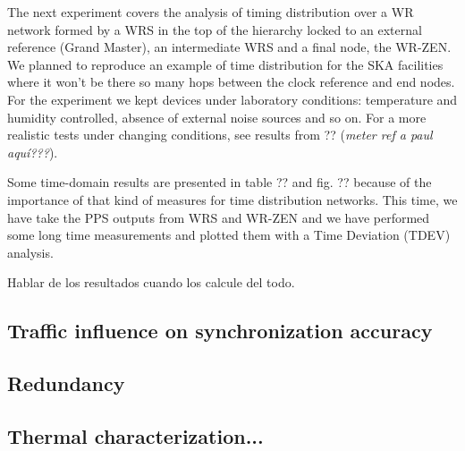 The next experiment covers the analysis of timing distribution over a WR network formed by a WRS in the top of the hierarchy locked to an external reference (Grand Master), an intermediate WRS and a final node, the WR-ZEN. We planned to reproduce an example of time distribution for the SKA facilities where it won't be there so many hops between the clock reference and end nodes.  For the experiment we kept devices under laboratory conditions: temperature and humidity controlled, absence of external noise sources and so on. For a more realistic tests under changing conditions, see results from ?? (\textit{meter ref a paul aquí???}).


Some time-domain results are presented in table ?? and fig. ?? because of the importance of that kind of measures for time distribution networks. This time, we have take the PPS outputs from WRS and WR-ZEN and we have performed some long time measurements and plotted them with a Time Deviation (TDEV) analysis.


Hablar de los resultados cuando los calcule del todo.


\subsection{Traffic influence on synchronization accuracy}


\subsection{Redundancy}


\subsection{Thermal characterization...}


 
